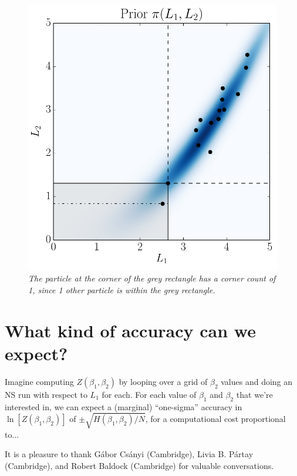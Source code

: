 \documentclass[journal,article,accept,moreauthors,pdftex,12pt,a4paper]{mdpi}
\begin{document}
\begin{figure}
\centering
\includegraphics[scale=0.5]{figures/joint.pdf}
\caption{\it The particle at the corner of the grey rectangle
has a corner count of 1, since 1 other particle is within the
grey rectangle.\label{fig:joint}}
\end{figure}



\section{What kind of accuracy can we expect?}
Imagine computing $Z(\beta_1, \beta_2)$ by looping over a grid of $\beta_2$
values and doing an NS run with respect to $L_1$ for each. For each
value of $\beta_1$ and $\beta_2$ that we're interested in, we can expect
a (marginal) ``one-sigma'' accuracy in
$\ln\left[Z(\beta_1, \beta_2)\right]$ of $\pm \sqrt{H(\beta_1, \beta_2)/N}$,
for a computational cost proportional to...


It is a pleasure to thank Gábor Csányi (Cambridge), Livia B. Pártay (Cambridge),
and Robert Baldock (Cambridge) for valuable conversations.

\end{document}
